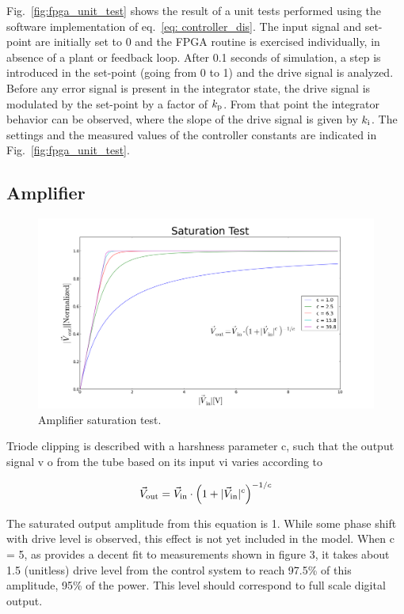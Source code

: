 \documentclass[a4paper,12pt]{article}
\begin{document}
Fig.~\ref{fig:fpga_unit_test} shows the result of a unit tests performed using the software implementation of eq.~\ref{eq: controller_dis}. The input signal and set-point are initially set to 0 and the FPGA routine is exercised individually, in absence of a plant or feedback loop. After 0.1 seconds of simulation, a step is introduced in the set-point (going from 0 to 1) and the drive signal is analyzed. Before any error signal is present in the integrator state, the drive signal is modulated by the set-point by a factor of $k_{\rm p}$. From that point the integrator behavior can be observed, where the slope of the drive signal is given by $k_{\rm i}$. The settings and the measured values of the controller constants are indicated in Fig.~\ref{fig:fpga_unit_test}. 

\subsection{Amplifier}

\begin{figure}
\centering
\includegraphics[scale=0.35]{../figures/saturation_test.png}
\caption{Amplifier saturation test.}
\label{fig:saturation_test}
\end{figure}

Triode clipping is described with a harshness parameter c, such that the output signal v o from the tube based on its input vi varies according to

\begin{equation}
  \vec V_{\rm out} = \vec V_{\rm in} \cdot \left(1 + |\vec V_{\rm in}|^c\right)^{-1/c}
\end{equation}

The saturated output amplitude from this equation is 1. While some phase shift with drive level is observed, this effect is not yet included in the model. When c = 5, as provides a decent fit to measurements shown in figure 3, it takes about 1.5 (unitless) drive level from the control system to reach 97.5\% of this amplitude, 95\% of the power. This level should correspond to full scale digital output.
\end{document}
